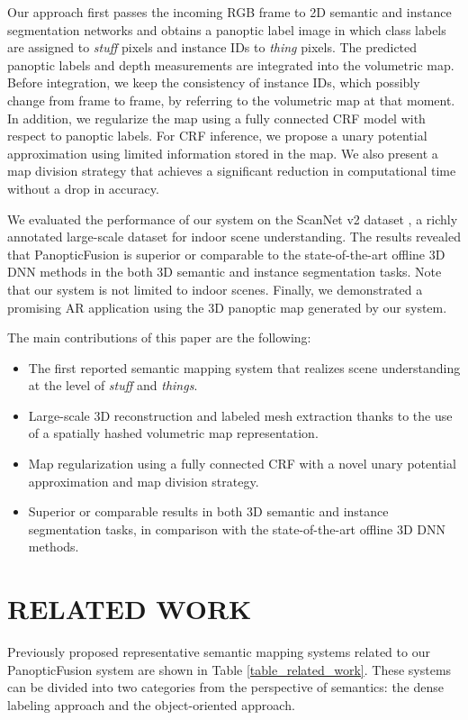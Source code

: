 \documentclass[letterpaper, 10pt, conference]{latex_template/ieeeconf}
\begin{document}
Our approach first passes the incoming RGB frame to 2D semantic and instance segmentation networks and obtains a panoptic label image in which class labels are assigned to {\it stuff} pixels and instance IDs to {\it thing} pixels.
The predicted panoptic labels and depth measurements are integrated into the volumetric map.
Before integration, we keep the consistency of instance IDs, which possibly change from frame to frame, by referring to the volumetric map at that moment.
In addition, we regularize the map using a fully connected CRF model with respect to panoptic labels.
For CRF inference, we propose a unary potential approximation using limited information stored in the map. 
We also present a map division strategy that achieves a significant reduction in computational time without a drop in accuracy.

We evaluated the performance of our system on the ScanNet v2 dataset \cite{dai2017scannet}, a richly annotated large-scale dataset for indoor scene understanding.
The results revealed that PanopticFusion is superior or comparable to the state-of-the-art offline 3D DNN methods in the both 3D semantic and instance segmentation tasks.
Note that our system is not limited to indoor scenes.
Finally, we demonstrated a promising AR application using the 3D panoptic map generated by our system.

The main contributions of this paper are the following:
\begin{itemize}
   \item The first reported semantic mapping system that realizes scene understanding at the level of {\it stuff} and {\it things}.
   \item Large-scale 3D reconstruction and labeled mesh extraction thanks to the use of a spatially hashed volumetric map representation.
   \item Map regularization using a fully connected CRF with a novel unary potential approximation and map division strategy.
   \item Superior or comparable results in both 3D semantic and instance segmentation tasks, in comparison with the state-of-the-art offline 3D DNN methods.
\end{itemize}


\section{RELATED WORK}
Previously proposed representative semantic mapping systems related to our PanopticFusion system are shown in Table \ref{table_related_work}.
These systems can be divided into two categories from the perspective of semantics: the dense labeling approach and the object-oriented approach.
\end{document}
